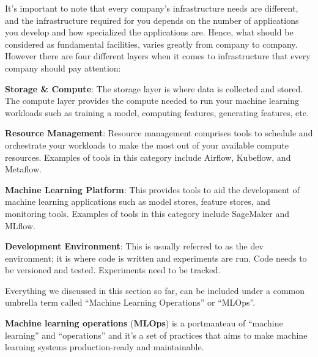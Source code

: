 It's important to note that every company's infrastructure needs are different, and the infrastructure required for
you depends on the number of applications you develop and how specialized the applications are. Hence, what should be
considered as fundamental facilities, varies greatly from company to company. However there are four different layers
when it comes to infrastructure that every company should pay attention:
\bit
\item \textbf{Storage \& Compute}: The storage layer is where data is collected and stored. The compute layer provides
the compute needed to run your machine learning workloads such as training a model, computing features, generating
features, etc.
\item \textbf{Resource Management}: Resource management comprises tools to schedule and orchestrate your workloads to
make the most out of your available compute resources. Examples of tools in this category include Airflow, Kubeflow,
and Metaflow.
\item \textbf{Machine Learning Platform}: This provides tools to aid the development of machine learning applications
such as model stores, feature stores, and monitoring tools. Examples of tools in this category include SageMaker and
MLflow.
\item \textbf{Development Environment}: This is usually referred to as the dev environment; it is where code is written
and experiments are run. Code needs to be versioned and tested. Experiments need to be tracked.
\eit

Everything we discussed in this section so far, can be included under a common umbrella term called ``Machine Learning 
Operations'' or ``MLOps''.

\textbf{Machine learning operations} (\textbf{MLOps}) is a portmanteau of ``machine learning'' and ``operations'' and
it's a set of practices that aims to make machine learning systems production-ready and maintainable.
\ed

